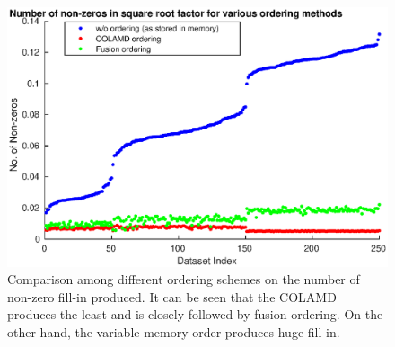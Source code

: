 \begin{figure}[!]
\includegraphics[width=\textwidth,  height=0.4\textheight]{Chapters/figures3/nnz_comparison}
\caption{Comparison among different ordering schemes on the number of non-zero fill-in produced. It can be seen that the COLAMD produces the least and is closely followed by fusion ordering. On the other hand, the variable memory order produces huge fill-in.}
\label{fig:nnz_comparison}
\end{figure}

